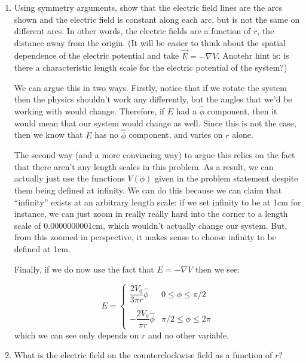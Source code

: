 \documentclass[10pt]{article}
\begin{document}
    \begin{enumerate}[label=(\alph*)]
        \item Using symmetry arguments, show that the electric field lines are the arcs shown and the electric field is constant along each arc, but is not the same on different arcs. In other words, the electric fields are a function of $r$, the distance away from the origin. (It will be easier to think about the spatial dependence of the electric potential and take $\vec E = -\nabla V$. Anotehr hint is: is there a characteristic length scale for the electric potential of the system?)
        
        \begin{solution}
            We can argue this in two ways. Firstly, notice that if we rotate the system then the physics shouldn't work any differently, but the angles that we'd be working with would change. Therefore, if $E$ had a $\hat \phi$ component, then it would mean that our system would change as well. Since this is not the case, then we know that $E$ has no $\hat \phi$ component, and varies on $r$ alone. 

            The second way (and a more convincing way) to argue this relies on the fact that there aren't any length scales in this problem. As a result, we can actually just use the functions $V(\phi)$ given in the problem statement despite them being defined at infinity. We can do this because we can claim that ``infinity'' exists at an arbitrary length scale: if we set infinity to be at 1cm for instance, we can just zoom in really really hard into the corner to a length scale of 0.0000000001cm, which wouldn't actually change our system. But, from this zoomed in perspective, it makes sense to choose infinity to be defined at 1cm. 

            Finally, if we do now use the fact that $E = - \nabla V$ then we see: 

            \[ E = \begin{cases}
                \dfrac{2V_0}{3\pi r} \hat \phi & 0 \le \phi \le \pi/2\\
                \\
                -\dfrac{2V_0}{\pi r} \hat \phi & \pi/2 \le \phi \le 2\pi
            \end{cases}\]
            which we can see only depends on $r$ and no other variable.
        \end{solution}
        \item What is the electric field on the counterclockwise field as a function of $r$?
        

\end{enumerate}
\end{document}
